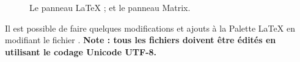 \documentclass[11pt,french]{article}
\newcommand{\mnu}[1]{\textsf{#1}}
\begin{document}
\begin{figure}
{}%
\qquad%
%
\caption[Les panneaux LaTeX et Matrix.]{
 Le panneau LaTeX ; et
 le panneau Matrix.}
\label{LandMPanels}
\end{figure}

Il est possible de faire quelques modifications et ajouts à la \mnu{Palette LaTeX} en modifiant le fichier . \textbf{Note : tous les fichiers  doivent être édités en utilisant le codage Unicode UTF-8.}

\end{document}
